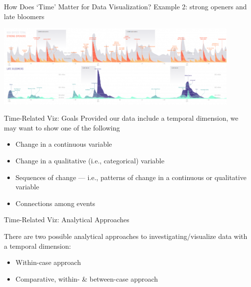 \documentclass[notes, aspectratio=1610]{beamer}
\begin{document}
\begin{frame}{How Does `Time' Matter for Data Visualization?}
	{Example 2: strong openers and late bloomers}
	\centering 
	\Large 

	\includegraphics[width=0.9\textwidth]{images/Day57-945x324.png}

\end{frame}

\begin{frame}{Time-Related Viz: Goals}{}
Provided our data include a temporal dimension, we may want to show one of 
the following 

\begin{itemize}
	\item 
	Change in a continuous variable
	\item 
	Change in a qualitative (i.e., categorical) variable
	\item 
	Sequences of change --- i.e., patterns of change in a continuous or
	qualitative variable
	\item 
	Connections among events
\end{itemize}

\end{frame}

\begin{frame}{Time-Related Viz: Analytical Approaches}{}

There are two possible analytical approaches to investigating/visualize 
data with a temporal dimension:

\begin{itemize}
	\item 
	Within-case approach
	\item 
	Comparative, within- \& between-case approach
\end{itemize}
 
\end{frame}
\end{document}
